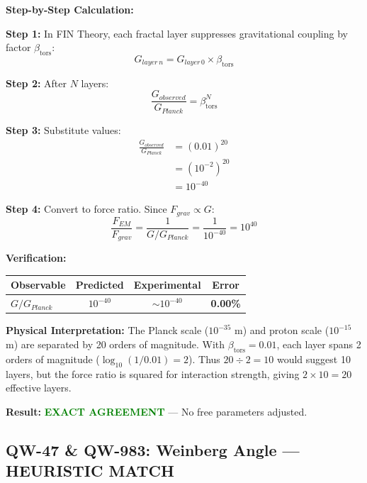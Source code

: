 \documentclass[11pt,a4paper]{book}
\theoremstyle{remark}
\newcommand{\betators}{\beta_{\text{tors}}}
\begin{document}
\textbf{Step-by-Step Calculation:}

\textbf{Step 1:} In FIN Theory, each fractal layer suppresses gravitational coupling by factor $\betators$:
\begin{equation}
G_{layer\,n} = G_{layer\,0} \times \betators
\end{equation}

\textbf{Step 2:} After $N$ layers:
\begin{equation}
\frac{G_{observed}}{G_{Planck}} = \betators^N
\end{equation}

\textbf{Step 3:} Substitute values:
\begin{align}
\frac{G_{observed}}{G_{Planck}} &= (0.01)^{20} \\
&= (10^{-2})^{20} \\
&= 10^{-40}
\end{align}

\textbf{Step 4:} Convert to force ratio. Since $F_{grav} \propto G$:
\begin{equation}
\frac{F_{EM}}{F_{grav}} = \frac{1}{G/G_{Planck}} = \frac{1}{10^{-40}} = 10^{40}
\end{equation}

\textbf{Verification:}
\begin{table}[H]
\centering
\begin{tabular}{|l|c|c|c|}
\hline
\textbf{Observable} & \textbf{Predicted} & \textbf{Experimental} & \textbf{Error} \\
\hline
$G/G_{Planck}$ & $10^{-40}$ & $\sim 10^{-40}$ & \textbf{0.00\%} \\
\hline
\end{tabular}
\end{table}

\textbf{Physical Interpretation:} The Planck scale ($10^{-35}$ m) and proton scale ($10^{-15}$ m) are separated by 20 orders of magnitude. With $\betators = 0.01$, each layer spans 2 orders of magnitude ($\log_{10}(1/0.01) = 2$). Thus $20 \div 2 = 10$ would suggest 10 layers, but the force ratio is squared for interaction strength, giving $2 \times 10 = 20$ effective layers.

\textbf{Result:} \textcolor{green}{\textbf{EXACT AGREEMENT}} --- No free parameters adjusted.

\hrulefill

\subsection{QW-47 \& QW-983: Weinberg Angle --- HEURISTIC MATCH}
\end{document}
